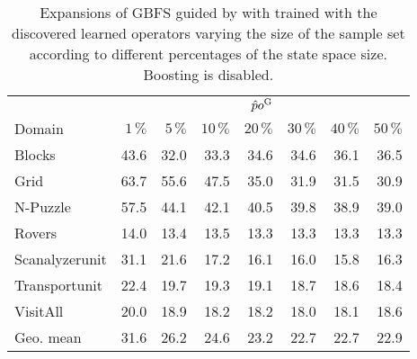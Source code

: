\begin{table}[!h]
\centering
\caption[Expansions of \pog without boosting]{Expansions of GBFS guided by \hnn with \pog trained with the discovered learned operators varying the size of the sample set according to different percentages of the state space size. Boosting is disabled.}
\label{tab:learning_discovered_pos_boost0}
\vspace{\baselineskip}
\begin{tabular}{lrrrrrrr}
\toprule
& \multicolumn{7}{c}{$\hat po^{\text{G}}$} \\
\cmidrule(lr){2-8}
Domain     & $1\,\%$ & $5\,\%$   & $10\,\%$ & $20\,\%$ & $30\,\%$ & $40\,\%$ & $50\,\%$ \\ \midrule
Blocks         & 43.6 & 32.0 & 33.3  & 34.6  & 34.6  & 36.1  & 36.5  \\
Grid           & 63.7 & 55.6 & 47.5  & 35.0  & 31.9  & 31.5  & 30.9  \\
N-Puzzle       & 57.5 & 44.1 & 42.1  & 40.5  & 39.8  & 38.9  & 39.0  \\
Rovers         & 14.0 & 13.4 & 13.5  & 13.3  & 13.3  & 13.3  & 13.3  \\
Scanalyzerunit & 31.1 & 21.6 & 17.2  & 16.1  & 16.0  & 15.8  & 16.3  \\
Transportunit  & 22.4 & 19.7 & 19.3  & 19.1  & 18.7  & 18.6  & 18.4  \\
VisitAll       & 20.0 & 18.9 & 18.2  & 18.2  & 18.0  & 18.1  & 18.6  \\ \midrule
Geo. mean      & 31.6 & 26.2 & 24.6  & 23.2  & 22.7  & 22.7  & 22.9 \\ \bottomrule
\end{tabular}
\end{table}
